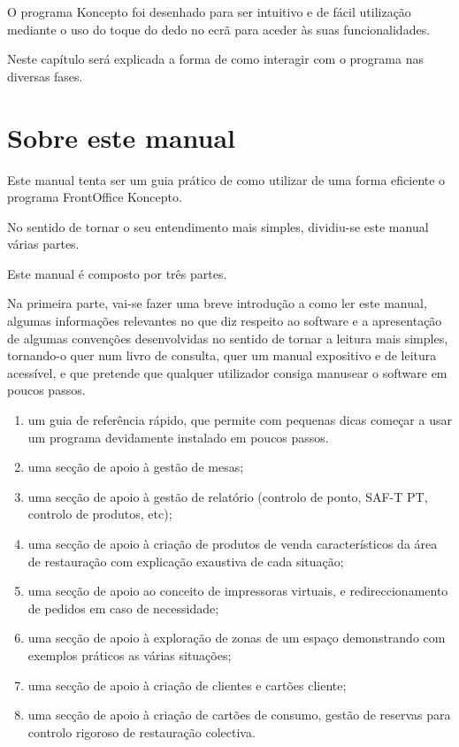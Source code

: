 \documentclass[a4paper,11pt,openany]{memoir}
\begin{document}
O programa Koncepto foi desenhado para ser intuitivo e de fácil utilização mediante o uso do toque do dedo 
no ecrã para aceder às suas funcionalidades. 

Neste capítulo será explicada a forma de como interagir com o programa nas diversas fases.

\section{Sobre este manual}

Este manual tenta ser um guia prático de como utilizar de uma forma eficiente o programa FrontOffice Koncepto.

No sentido de tornar o seu entendimento mais simples, dividiu-se este manual várias partes.


Este manual é composto por três partes.

Na primeira parte, vai-se fazer uma breve introdução a como ler este manual, algumas informações relevantes no que diz respeito ao software 
e a apresentação de algumas convenções desenvolvidas no sentido de tornar a leitura mais simples, tornando-o quer num livro de consulta, 
quer um manual expositivo e de leitura acessível, e que pretende que qualquer utilizador consiga manusear o software em poucos passos.


\begin{enumerate}
\item um guia de referência rápido, que permite com pequenas dicas começar a usar um programa devidamente instalado em poucos passos.
\item uma secção de apoio à gestão de mesas;
\item uma secção de apoio à gestão de relatório (controlo de ponto, SAF-T PT, controlo de produtos, etc);
\item uma secção de apoio à criação de produtos de venda característicos da área de restauração com explicação exaustiva de cada situação;
\item uma secção de apoio ao conceito de impressoras virtuais, e redireccionamento de pedidos em caso de necessidade; 
\item uma secção de apoio à exploração de zonas de um espaço demonstrando com exemplos práticos as várias situações;
\item uma secção de apoio à criação de clientes e cartões cliente;
\item uma secção de apoio à criação de cartões de consumo, gestão de reservas para controlo rigoroso de restauração colectiva.
\end{enumerate}
\end{document}

